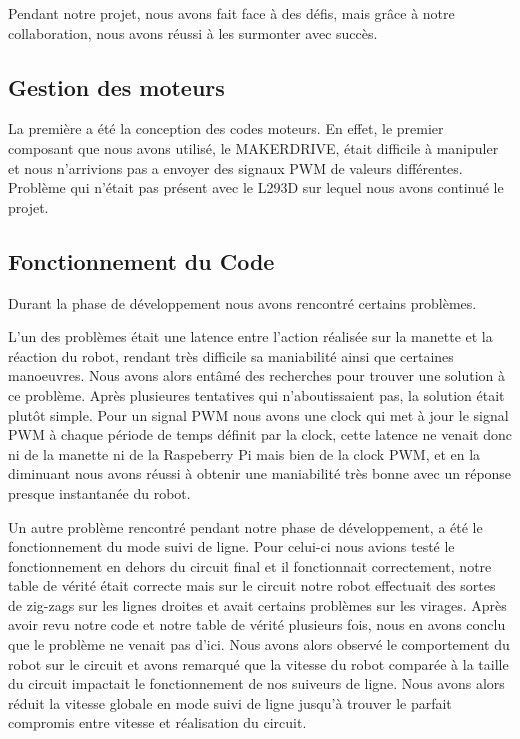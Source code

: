 Pendant notre projet, nous avons fait face à des défis, mais grâce à notre collaboration, nous avons réussi à les surmonter avec succès.

\subsection{Gestion des moteurs}
La première a été la conception des codes moteurs. En effet, le premier composant que nous avons utilisé, le MAKERDRIVE, était difficile à manipuler et nous n'arrivions pas a envoyer des signaux PWM de valeurs différentes. Problème qui n'était pas présent avec le L293D sur lequel nous avons continué le projet.

\subsection{Fonctionnement du Code}
Durant la phase de développement nous avons rencontré certains problèmes.

L'un des problèmes était une latence entre l'action réalisée sur la manette et la réaction du robot, rendant très difficile sa maniabilité ainsi que certaines manoeuvres. Nous avons alors entâmé des recherches pour trouver une solution à ce problème. Après plusieures tentatives qui n'aboutissaient pas, la solution était plutôt simple. Pour un signal PWM nous avons une clock qui met à jour le signal PWM à chaque période de temps définit par la clock, cette latence ne venait donc ni de la manette ni de la Raspeberry Pi mais bien de la clock PWM, et en la diminuant nous avons réussi à obtenir une maniabilité très bonne avec un réponse presque instantanée du robot.

Un autre problème rencontré pendant notre phase de développement, a été le fonctionnement du mode suivi de ligne. Pour celui-ci nous avions testé le fonctionnement en dehors du circuit final et il fonctionnait correctement, notre table de vérité était correcte mais sur le circuit notre robot effectuait des sortes de zig-zags sur les lignes droites et avait certains problèmes sur les virages. Après avoir revu notre code et notre table de vérité plusieurs fois, nous en avons conclu que le problème ne venait pas d'ici. Nous avons alors observé le comportement du robot sur le circuit et avons remarqué que la vitesse du robot comparée à la taille du circuit impactait le fonctionnement de nos suiveurs de ligne. Nous avons alors réduit la vitesse globale en mode suivi de ligne jusqu'à trouver le parfait compromis entre vitesse et réalisation du circuit.


